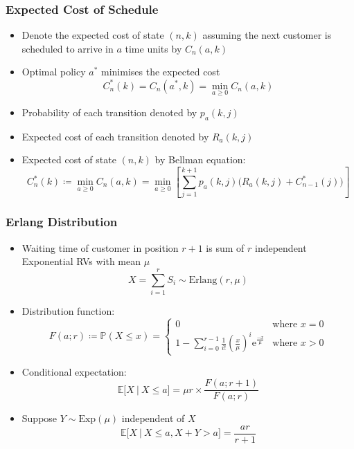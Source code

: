 \documentclass{beamer}
\begin{document}
\begin{frame}
	\frametitle{Expected Cost of Schedule}

	\begin{itemize}
		\item Denote the expected cost of state $(n, k)$ assuming the next customer is scheduled to arrive in $a$ time units by $C_{n} (a, k)$
		\item Optimal policy $a^{*}$ minimises the expected cost
		\begin{equation*}
			C_{n}^{*} (k) = C_{n} (a^{*}, k) = \min_{a \geq 0} C_{n} (a, k)
		\end{equation*}
		\item Probability of each transition denoted by $p_{a} (k, j)$
		\item Expected cost of each transition denoted by $R_{a} (k, j)$
		\item Expected cost of state $(n, k)$ by \alert{Bellman equation}:
		\begin{equation*}
			C_{n}^{*} (k) \coloneqq \min_{a \geq 0} C_{n} (a, k) = \min_{a \geq 0} \left[ \sum_{j = 1}^{k + 1} p_{a} (k, j) \Big( R_{a} (k, j) + C_{n - 1}^{*} (j) \Big) \right]
		\end{equation*}
	\end{itemize}
\end{frame}

\begin{frame}
	\frametitle{Erlang Distribution}

	\begin{itemize}
		\item Waiting time of customer in position $r + 1$ is sum of $r$ independent Exponential RVs with mean $\mu$
		\begin{equation*}
		 	X = \sum_{i = 1}^{r} S_{i} \sim \text{Erlang} (r, \mu)
		\end{equation*}
		\item Distribution function:
		\begin{equation*}
			F (a; r) \coloneqq \mathbb{P} (X \leq x) = \begin{cases} 0 & \text{where $x = 0$} \\ 1 - \sum_{i = 0}^{r - 1} \frac{1}{i!} \left( \frac{x}{\mu} \right)^{i} \mathrm{e}^{\frac{-x}{\mu}} & \text{where $x > 0$} \end{cases}
		\end{equation*}
		\item Conditional expectation:
		\begin{equation*}
			\mathbb{E} \Big[ X \ \big| \ X \leq a \Big] = \mu r \times \frac{F (a; r + 1)}{F (a; r)}
		\end{equation*}
		\item Suppose $Y \sim \text{Exp} (\mu)$ independent of $X$ 
		\begin{equation*}
			\mathbb{E} \Big[ X \ \big| \ X \leq a, X + Y > a \Big] = \frac{a r}{r + 1}
		\end{equation*}
	\end{itemize}
\end{frame}
\end{document}
